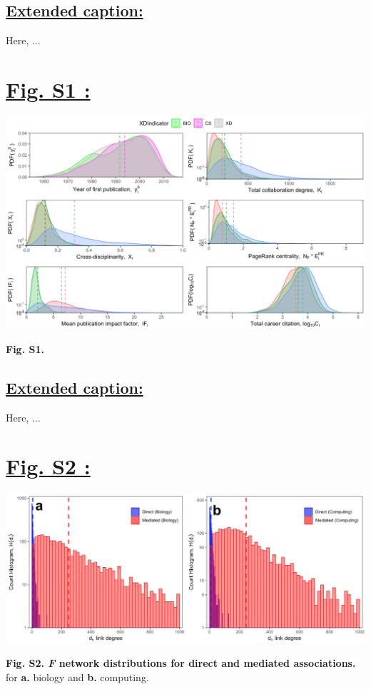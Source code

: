 \documentclass{article}\usepackage[]{graphicx}\usepackage[]{color}
\begin{document}
\subsection*{\underline{Extended caption:}}
\par{Here, ...}

\newpage
\section*{\underline{Fig. S1 :}}
\begin{center}
\includegraphics[scale=0.4]{3_ggplot.png}
\newline
\par{\textbf{Fig. S1.}}
\end{center}
\subsection*{\underline{Extended caption:}}
\par{Here, ...}

\newpage
\section*{\underline{Fig. S2 :}}
\begin{center}
\includegraphics[scale=0.45]{S2.png}
\newline
\par{\textbf{Fig. S2. \textit{F} network distributions for direct and mediated associations.} for \textbf{a.} biology and \textbf{b.} computing.}
\end{center}
\end{document}
